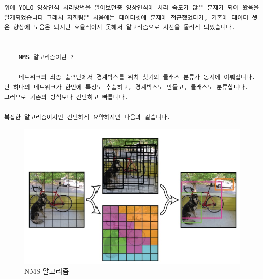 \documentclass{article}
\begin{document}
\author{(2) YOLO 향상 제안 NMS 알고리즘}

\begin{verbatim}
위에 YOLO 영상인식 처리방법을 알아보던중 영상인식에 처리 속도가 많은 문제가 되어 왔음을 알게되었습니다 그래서 저희팀은 처음에는 데이터셋에 문제에 접근했었다가, 기존에 데이터 셋은 향상에 도움은 되지만 효율적이지 못해서 알고리즘으로 시선을 돌리게 되었습니다.


    NMS 알고리즘이란 ?
    
    네트워크의 최종 출력단에서 경계박스를 위치 찾기와 클래스 분류가 동시에 이뤄집니다.
단 하나의 네트워크가 한번에 특징도 추출하고, 경계박스도 만들고, 클래스도 분류합니다.  그러므로 기존의 방식보다 간단하고 빠릅니다.

복잡한 알고리즘이지만 간단하게 요약하지만 다음과 같습니다.
\end{verbatim}

\begin{figure}[h!]
\centering
\includegraphics[scale=1.0]{enhanceyolo3.jpg}
\caption{ NMS 알고리즘 }
\label{fig:detect}
\end{figure}
\end{document}
